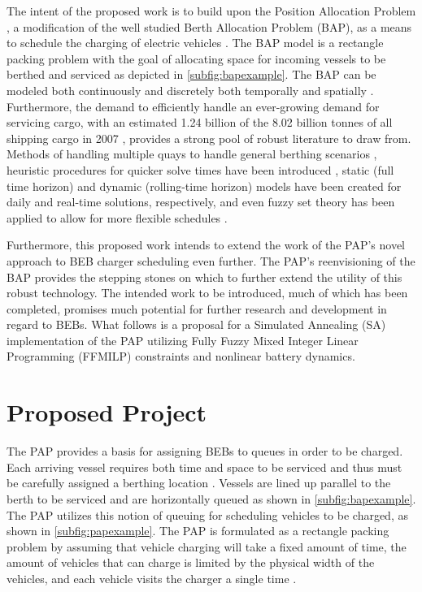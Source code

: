 \documentclass[11pt,a4paper,final]{article}
\begin{document}
The intent of the proposed work is to build upon the Position Allocation Problem \cite{qarebagh-2019-optim-sched}, a
modification of the well studied Berth Allocation Problem (BAP), as a means to schedule the charging of electric
vehicles \cite{buhrkal-2011-model-discr,frojan-2015-contin-berth,imai-2001-dynam-berth}. The BAP model is a rectangle
packing problem with the goal of allocating space for incoming vessels to be berthed and serviced as depicted in
\autoref{subfig:bapexample}. The BAP can be modeled both continuously and discretely both temporally and spatially
\cite{buhrkal-2011-model-discr,frojan-2015-contin-berth}. Furthermore, the demand to efficiently handle an
ever-growing demand for servicing cargo, with an estimated 1.24 billion of the 8.02 billion tonnes of all shipping cargo
in 2007 \cite{buhrkal-2011-model-discr}, provides a strong pool of robust literature to draw from. Methods of handling
multiple quays to handle general berthing scenarios \cite{frojan-2015-contin-berth,dai-2008-suppl-chain-analy},
heuristic procedures for quicker solve times have been introduced \cite{imai-2001-dynam-berth}, static (full time
horizon) and dynamic (rolling-time horizon) models have been created for daily and real-time solutions, respectively,
and even fuzzy set theory has been applied to allow for more flexible schedules \cite{bello-2019-fuzzy-activ}.

Furthermore, this proposed work intends to extend the work of the PAP's novel approach to BEB charger scheduling even
further. The PAP's reenvisioning of the BAP provides the stepping stones on which to further extend the utility of this
robust technology. The intended work to be introduced, much of which has been completed, promises much potential for
further research and development in regard to BEBs. What follows is a proposal for a Simulated Annealing (SA)
implementation of the PAP utilizing Fully Fuzzy Mixed Integer Linear Programming (FFMILP) constraints and nonlinear
battery dynamics.
\section{Proposed Project}
\label{sec:proposed-project}
The PAP provides a basis for assigning BEBs to queues in order to be charged. Each arriving vessel requires both time
and space to be serviced and thus must be carefully assigned a berthing location \cite{imai-2001-dynam-berth}. Vessels
are lined up parallel to the berth to be serviced and are horizontally queued as shown in \autoref{subfig:bapexample}.
The PAP utilizes this notion of queuing for scheduling vehicles to be charged, as shown in \autoref{subfig:papexample}.
The PAP is formulated as a rectangle packing problem by assuming that vehicle charging will take a fixed amount of time,
the amount of vehicles that can charge is limited by the physical width of the vehicles, and each vehicle visits the
charger a single time \cite{qarebagh-2019-optim-sched}.
\end{document}
